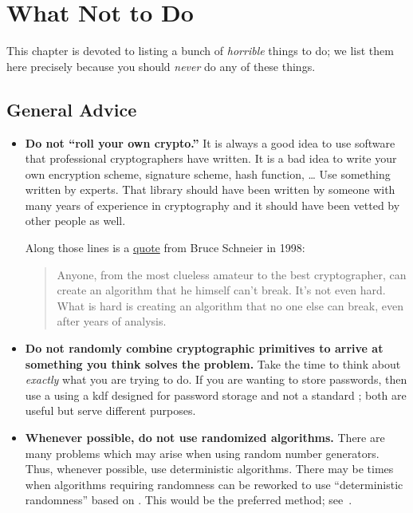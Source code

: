 \chapter{What Not to Do}
\label{chap:do_not}

This chapter is devoted to listing a bunch of \emph{horrible}
things to do;
we list them here precisely because you should \emph{never}
do any of these things.

\section{General Advice}

\begin{itemize}
\item \textbf{Do not ``roll your own crypto.''}
    It is always a good idea to use software that professional cryptographers
        have written.
    It is a bad idea to write your own \gls{encryption scheme},
        \gls{signature} scheme,
        \gls{hash function}, \dots
    Use something written by experts.
    That library should have been written by someone with many years
        of experience in cryptography and it should have been vetted
        by other people as well.

    Along those lines is a
    \href{https://www.schneier.com/crypto-gram/archives/1998/1015.html#cipherdesign}{quote}
    from Bruce Schneier in 1998:

\begin{quote}
    Anyone, from the most clueless amateur to the best cryptographer,
    can create an algorithm that he himself can't break.
    It's not even hard. What is hard is creating an algorithm
    that no one else can break, even after years of analysis.
\end{quote}

\item \textbf{Do not randomly combine cryptographic primitives
    to arrive at something you think solves the problem.}
    Take the time to think about \emph{exactly} what you are trying to do.
    If you are wanting to store passwords,
    then use a using a \gls{kdf} designed
    for password storage
    and not a standard ;
    both are useful but serve different purposes.

\item \textbf{Whenever possible, do not use randomized algorithms.}
    There are many problems which may arise when using
        random number generators.
    Thus, whenever possible, use deterministic algorithms.
    There may be times when algorithms requiring randomness
    can be reworked to use ``deterministic randomness'' based on
    .
    This would be the preferred method; see~\cite{rfc6979}.


\end{itemize}
